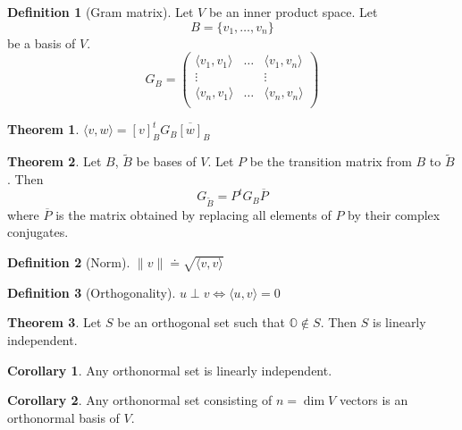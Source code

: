 \documentclass[fleqn, a5paper, 10pt]{amsart}
\theoremstyle{definition}
\newtheorem{definition}{Definition} %
\theoremstyle{theorem}
\newtheorem{theorem}{Theorem} %
\newtheorem{corollary}{Corollary}
\theoremstyle{remark}
\numberwithin{corollary}{theorem}
\numberwithin{equation}{theorem}
\begin{document}
\begin{definition}[Gram matrix]
	Let $V$ be an inner product space. Let 
	\begin{equation*}
		B = \{v_1, \dots, v_n\}
	\end{equation*}
	be a basis of $V$.
	\begin{equation*}
		G_B = 
			\begin{pmatrix}
				\langle v_1, v_1 \rangle & \dots & \langle v_1, v_n \rangle\\
				\vdots & & \vdots\\
				\langle v_n, v_1 \rangle & \dots & \langle v_n, v_n \rangle\\
			\end{pmatrix}
	\end{equation*}
\end{definition}

\begin{theorem}
	$ \langle v, w \rangle = [v]_B^t G_B \overline{[w]}_B $
\end{theorem}

\begin{theorem}
	Let $B$, $\widetilde{B}$ be bases of $V$. Let $P$ be the transition matrix from $B$ to $\widetilde{B}$. Then 
	\begin{equation*}
		G_{\widetilde{B}} = P^t G_B \overline{P}
	\end{equation*}
	where $\overline{P}$ is the matrix obtained by replacing all elements of $P$ by their complex conjugates.
\end{theorem}

\begin{definition}[Norm]
	$ \| v \| \doteq \sqrt{\langle v, v \rangle} $
\end{definition}

\begin{definition}[Orthogonality]
	$ u \perp v \iff \langle u, v \rangle = 0$
\end{definition}

\begin{theorem}
	Let $S$ be an orthogonal set such that $\mathbb{O} \notin S$. Then $S$ is linearly independent.
\end{theorem}

\begin{corollary}
	Any orthonormal set is linearly independent.
\end{corollary}

\begin{corollary}
	Any orthonormal set consisting of $n = \dim V$ vectors is an orthonormal basis of $V$.
\end{corollary}
\end{document}

